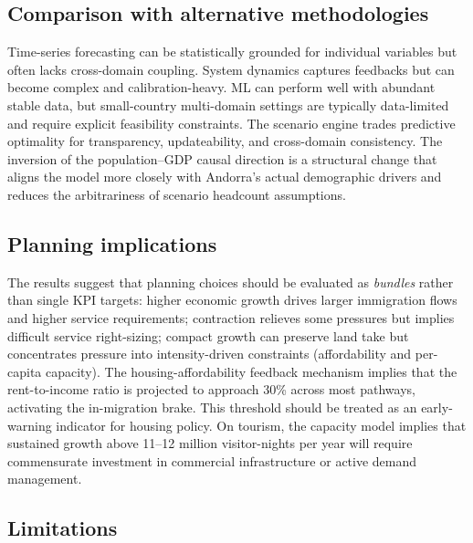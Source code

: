 \documentclass{article}
\begin{document}
\subsection{Comparison with alternative methodologies}

Time-series forecasting can be statistically grounded for individual variables
but often lacks cross-domain coupling. System dynamics captures feedbacks but
can become complex and calibration-heavy. ML can perform well with abundant
stable data, but small-country multi-domain settings are typically data-limited
and require explicit feasibility constraints. The scenario engine trades
predictive optimality for transparency, updateability, and cross-domain
consistency. The inversion of the population--GDP causal direction is a
structural change that aligns the model more closely with Andorra's actual
demographic drivers and reduces the arbitrariness of scenario headcount
assumptions.

\subsection{Planning implications}

The results suggest that planning choices should be evaluated as \emph{bundles}
rather than single KPI targets: higher economic growth drives larger immigration
flows and higher service requirements; contraction relieves some pressures but
implies difficult service right-sizing; compact growth can preserve land take
but concentrates pressure into intensity-driven constraints (affordability and
per-capita capacity). The housing-affordability feedback mechanism implies that
the rent-to-income ratio is projected to approach 30\% across most pathways,
activating the in-migration brake. This threshold should be treated as an
early-warning indicator for housing policy. On tourism, the capacity model
implies that sustained growth above 11--12 million visitor-nights per year will
require commensurate investment in commercial infrastructure or active demand
management.

\subsection{Limitations}
\end{document}
